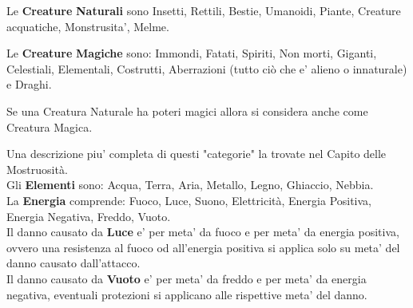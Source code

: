 Le \textbf{Creature} \textbf{Naturali} sono Insetti, Rettili, Bestie, Umanoidi, Piante, Creature acquatiche, Monstrusita', Melme.

Le \textbf{Creature} \textbf{Magiche} sono: Immondi, Fatati, Spiriti, Non morti, Giganti, Celestiali, Elementali, Costrutti, Aberrazioni (tutto ciò che e' alieno o innaturale) e Draghi.

Se una Creatura Naturale ha poteri magici allora si considera anche come Creatura Magica.

Una descrizione piu' completa di questi "categorie" la trovate nel Capito delle Mostruosità.\\

Gli \textbf{Elementi} sono: Acqua, Terra, Aria, Metallo, Legno, Ghiaccio, Nebbia.\\
La \textbf{Energia} comprende: Fuoco, Luce, Suono, Elettricità, Energia Positiva, Energia Negativa, Freddo, Vuoto.\\
Il danno causato da \textbf{Luce} e' per meta' da fuoco e per meta' da energia positiva, ovvero una resistenza al fuoco od all'energia positiva si applica solo su meta' del danno causato dall'attacco.\\
Il danno causato da \textbf{Vuoto} e' per meta' da freddo e per meta' da energia negativa, eventuali protezioni si applicano alle rispettive meta' del danno.\\

\pagebreak



